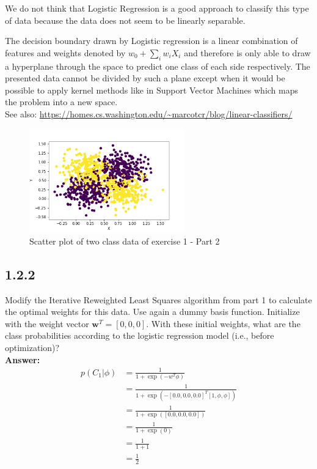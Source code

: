 \documentclass[a4paper]{article}
\begin{document}
\vspace{1em}

We do not think that Logistic Regression is a good approach to classify this type of data because the data does not seem to be linearly separable.

The decision boundary drawn by Logistic regression is a linear combination of features and weights denoted by $w_0 + \sum_i w_iX_i$ and therefore is only able to draw a hyperplane through the space to predict one class of each side respectively. The presented data cannot be divided by such a plane except when it would be possible to apply kernel methods like in Support Vector Machines which maps the problem into a new space.\\

See also: \url{https://homes.cs.washington.edu/~marcotcr/blog/linear-classifiers/}


\begin{figure}[H]
\center
\includegraphics[width=0.6\textwidth]{Images/figure_1_2_1.png}
\caption{Scatter plot of two class data of exercise 1 - Part 2}
\label{Fig:1_2_1}
\end{figure}





\subsection*{1.2.2}

Modify the Iterative Reweighted Least Squares algorithm from part 1 to calculate the optimal weights for this data. Use again a dummy basis function. Initialize with the weight vector $\textbf{w}^T = [0, 0, 0]$. With these initial weights, what are the class probabilities according to the logistic regression model (i.e., before optimization)?\\

\textbf{Answer:}\\

\begin{align*}
p(C_1 | \phi) &= \frac{1}{1 + \exp(-w^T \phi)}\\
&= \frac{1}{1 + \exp(-[0.0, 0.0, 0.0]^T [1, \phi, \phi])}\\
&= \frac{1}{1 + \exp([0.0, 0.0, 0.0])}\\
&= \frac{1}{1 + \exp(0)}\\
&= \frac{1}{1 + 1}\\
&= \frac{1}{2}
\end{align*}
\end{document}
